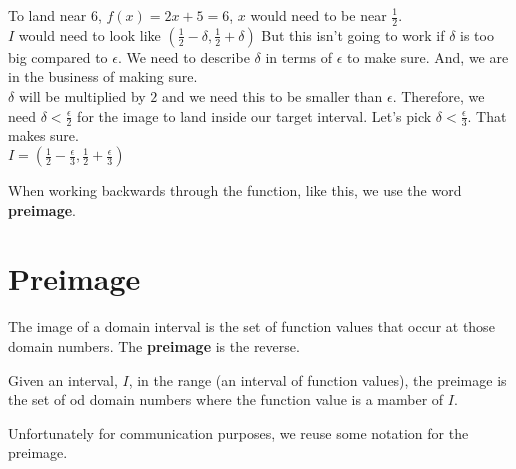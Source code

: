 \documentclass{ximera}
\begin{document}
To land near $6$, $f(x) = 2x + 5 = 6$, $x$ would need to be near $\frac{1}{2}$.  \\

$I$ would need to look like $\left( \frac{1}{2} - \delta, \frac{1}{2}+ \delta \right)$  But this isn't going to work if $\delta$ is too big compared to $\epsilon$.  We need to describe $\delta$ in terms of $\epsilon$ to make sure.  And, we are in the business of making sure. \\



$\delta$ will be multiplied by $2$ and we need this to be smaller than $\epsilon$.  Therefore, we need $\delta < \frac{\epsilon}{2}$ for the image to land inside our target interval.  Let's pick $\delta < \frac{\epsilon}{3}$.  That makes sure. \\



$I = \left( \frac{1}{2} - \frac{\epsilon}{3}, \frac{1}{2} + \frac{\epsilon}{3} \right)$




When working backwards through the function, like this, we use the word \textbf{preimage}.



























\section{Preimage}




The image of a domain interval is the set of function values that occur at those domain numbers.  The \textbf{preimage} is the reverse.  

Given an interval, $I$, in the range (an interval of function values), the preimage is the set of od domain numbers where the function value is a mamber of $I$.

Unfortunately for communication purposes, we reuse some notation for the preimage.
\end{document}

